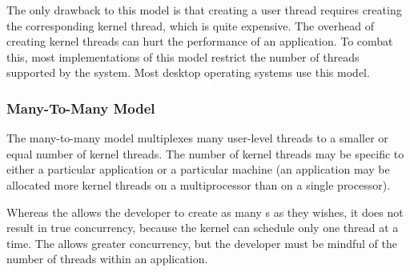 The only drawback to this model is that creating a user thread requires creating the corresponding kernel thread, which is quite expensive.
The overhead of creating kernel threads can hurt the performance of an application.
To combat this, most implementations of this model restrict the number of threads supported by the system.
Most desktop operating systems use this model.

\subsubsection{Many-To-Many Model}\label{subsubsec:Many_To_Many_Model}
The many-to-many model multiplexes many user-level threads to a smaller or equal number of kernel threads.
The number of kernel threads may be specific to either a particular application or a particular machine (an application may be allocated more kernel threads on a multiprocessor than on a single processor).

Whereas the  allows the developer to create as many s as they wishes, it does not result in true concurrency, because the kernel can schedule only one thread at a time.
The  allows greater concurrency, but the developer must be mindful of the number of threads within an application.


